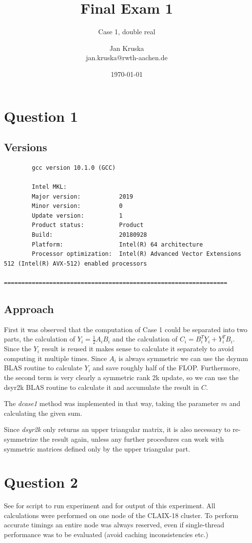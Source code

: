 \documentclass{scrartcl}
\title{Final Exam 1}
\subtitle{Case 1, double real}
\author{Jan Kruska \\ jan.kruska@rwth-aachen.de}
\date{\today}
\begin{document}
	
	\maketitle
	
	
	\section{Question 1}
	\subsection{Versions}
	\begin{verbatim}
		gcc version 10.1.0 (GCC)
		
		Intel MKL:
		Major version:           2019
		Minor version:           0
		Update version:          1
		Product status:          Product
		Build:                   20180928
		Platform:                Intel(R) 64 architecture
		Processor optimization:  Intel(R) Advanced Vector Extensions 512 (Intel(R) AVX-512) enabled processors
		================================================================
	\end{verbatim}
	
	\subsection{Approach}
	
	First it was observed that the computation of Case 1 could be separated into two parts, the calculation of $Y_i = \frac{1}{2}A_iB_i$ and the calculation of $C_i = B_i^TY_i + Y_i^TB_i$.
	Since the $Y_i$ result is reused it makes sense to calculate it separately to avoid computing it multiple times.
	Since $A_i$ is always symmetric we can use the dsymm BLAS routine to calculate $Y_i$ and save roughly half of the FLOP.
	Furthermore, the second term is very clearly a symmetric rank 2k update, so we can use the dsyr2k BLAS routine to calculate it and accumulate the result in $C$.
	
	The \emph{dcase1} method was implemented in that way, taking the parameter $m$ and calculating the given sum.
	
	Since \emph{dsyr2k} only returns an upper triangular matrix, it is also necessary to re-symmetrize the result again, unless any further procedures can work with symmetric matrices defined only by the upper triangular part.
	
	\section{Question 2}
	See  for script to run experiment and  for output of this experiment.
	All calculations were performed on one node of the CLAIX-18 cluster.
	To perform accurate timings an entire node was always reserved, even if single-thread performance was to be evaluated (avoid caching inconsistencies etc.)
	
\end{document}

